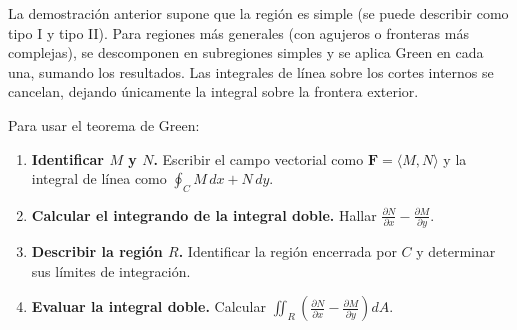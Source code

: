 \begin{rem}
La demostración anterior supone que la región es simple (se puede
describir como tipo I y tipo II). Para regiones más generales (con
agujeros o fronteras más complejas), se descomponen en subregiones
simples y se aplica Green en cada una, sumando los resultados. Las
integrales de línea sobre los cortes internos se cancelan, dejando
únicamente la integral sobre la frontera exterior.
\end{rem}

\begin{pasos}
Para usar el teorema de Green:
\begin{enumerate}
    \item \textbf{Identificar $M$ y $N$.} Escribir el campo vectorial
    como $\mathbf{F}=\langle M,N \rangle$ y la integral de línea como
    $\oint_C M\,dx + N\,dy$.
    \item \textbf{Calcular el integrando de la integral doble.}
    Hallar $\displaystyle \frac{\partial N}{\partial x} -
    \frac{\partial M}{\partial y}$.
    \item \textbf{Describir la región $R$.} Identificar la región
    encerrada por $C$ y determinar sus límites de integración.
    \item \textbf{Evaluar la integral doble.} Calcular
    $\displaystyle \iint_R \left( \frac{\partial N}{\partial x} -
    \frac{\partial M}{\partial y} \right) dA$.
\end{enumerate}
\end{pasos}

